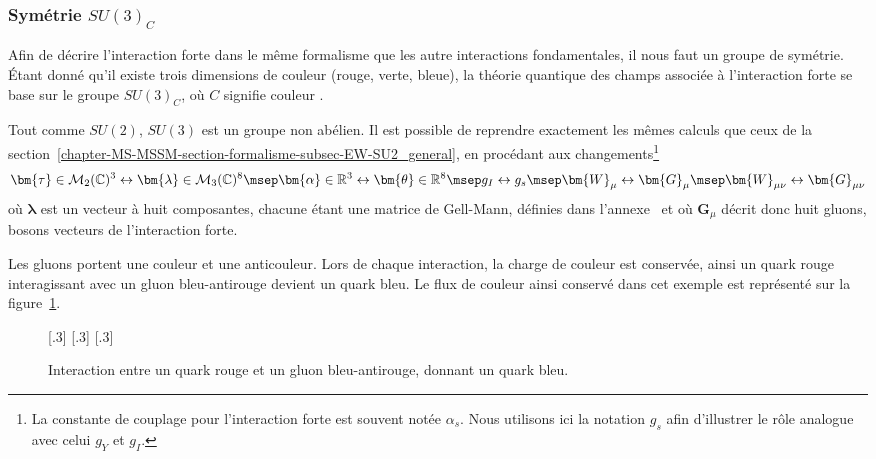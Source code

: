 \subsubsection{Symétrie $SU(3)_C$}\label{chapter-MS-MSSM-section-formalisme-subsec-QCD-subsubsec-SU3C}
Afin de décrire l'interaction forte dans le même formalisme que les autre interactions fondamentales, il nous faut un groupe de symétrie. Étant donné qu'il existe trois dimensions de couleur (rouge, verte, bleue), la théorie quantique des champs associée à l'interaction forte se base sur le groupe $SU(3)_C$, où $C$ signifie \og couleur \fg.
\par Tout comme $SU(2)$, $SU(3)$ est un groupe non abélien. Il est possible de reprendre exactement les mêmes calculs que ceux de la section~\ref{chapter-MS-MSSM-section-formalisme-subsec-EW-SU2_general}, en procédant aux changements\footnote{La constante de couplage pour l'interaction forte est souvent notée $\alpha_s$. Nous utilisons ici la notation $g_s$ afin d'illustrer le rôle analogue avec celui $g_Y$ et $g_I$.}
\begin{equation}
\bm{\tau} \in \mathcal{M}_2(\mathbb{C})^3 \leftrightarrow \bm{\lambda} \in \mathcal{M}_3(\mathbb{C})^8
\msep
\bm{\alpha}\in\mathbb{R}^3 \leftrightarrow \bm{\theta}\in\mathbb{R}^8
\msep
g_I \leftrightarrow g_s
\msep
\bm{W}_\mu \leftrightarrow \bm{G}_\mu
\msep
\bm{W}_{\mu\nu} \leftrightarrow \bm{G}_{\mu\nu}
\label{eq-chapter-MS-MSSM-section-formalisme-subsec-QCD-subsubsec-SU3C-analogieSU2}
\end{equation}
où $\bm{\lambda}$ est un vecteur à huit composantes, chacune étant une matrice de Gell-Mann, définies dans l'annexe~ et où $\bm{G}_\mu$ décrit donc huit gluons, bosons vecteurs de l'interaction forte.
\par Les gluons portent une couleur et une anticouleur. Lors de chaque interaction, la charge de couleur est conservée, ainsi un quark rouge interagissant avec un gluon bleu-antirouge devient un quark bleu. Le flux de couleur ainsi conservé dans cet exemple est représenté sur la figure~\ref{fig-fgraph-QCD_color_flux}.
\begin{figure}[h]
\centering
\vspace{\baselineskip}
[.3\textwidth]
{\vspace{\baselineskip}}
\hfill
{}[.3\textwidth]
{\vspace{\baselineskip}}
\hfill
{}[.3\textwidth]
{\vspace{\baselineskip}}

\caption[Interaction entre un quark et un gluon.]{Interaction entre un quark rouge et un gluon bleu-antirouge, donnant un quark bleu.}
\label{fig-fgraph-QCD_color_flux}
\end{figure}

